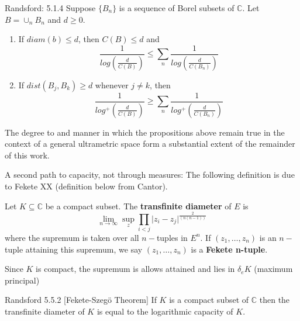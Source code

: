 \begin{proposition}
Randsford: 5.1.4
Suppose $\{B_n\}$ is a sequence of Borel subsets of $\mathbb{C}$. Let $B=\cup_n B_n$ and $d \geq 0$. 
\begin{enumerate}
\item If $diam(b) \leq d$, then $C(B) \leq d$ and \[\frac{1}{log(\frac{d}{C(B)})} \leq \sum_n \frac{1}{log(\frac{d}{C(B_n)})}\]
\item If $dist(B_j, B_k) \geq d$ whenever $j \neq k$, then \[\frac{1}{log^+(\frac{d}{C(B)})} \geq \sum_n \frac{1}{log^+(\frac{d}{C(B_n)})}\]
\end{enumerate}
\end{proposition}

The degree to and manner in which the propositions above remain true in the context of a general ultrametric space form a substantial extent of the remainder of this work.

A second path to capacity, not through measures:
The following definition is due to Fekete XX (definition below from Cantor). 

\begin{definition}
Let $K \subseteq \mathbb{C}$ be a compact subset. The \textbf{transfinite diameter} of $E$ is \[ \lim_{n\to\infty} \sup_z \prod_{i < j} \lvert z_i - z_j \rvert^{\frac{2}{(n(n-1))}} \] where the supremum is taken over all $n-$tuples in $E^n$. If $(z_1,\ldots,z_n)$ is an $n-$tuple attaining this supremum, we say $(z_1,\ldots,z_n)$ is a \textbf{Fekete n-tuple}.
\end{definition}

Since $K$ is compact, the supremum is allows attained and lies in $\delta_e K$ (maximum principal)

\begin{proposition}
Randsford 5.5.2 [Fekete-Szeg\"o Theorem] If $K$ is a compact subset of $\mathbb{C}$ then the transfinite diameter of $K$ is equal to the logarithmic capacity of $K$.
\end{proposition}



